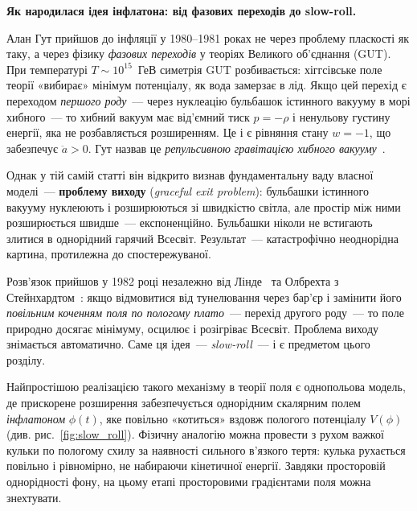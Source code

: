 \begin{keybox}
\textbf{Як народилася ідея інфлатона: від фазових переходів до slow-roll.}

Алан Гут прийшов до інфляції у 1980--1981 роках не через проблему
пласкості як таку, а через фізику \emph{фазових переходів} у теоріях
Великого об'єднання (GUT). При температурі $T \sim 10^{15}$~ГеВ
симетрія GUT розбивається: хіггсівське поле теорії «вибирає» мінімум
потенціалу, як вода замерзає в лід. Якщо цей перехід є переходом
\emph{першого роду}~--- через нуклеацію бульбашок істинного вакууму
в морі хибного~--- то хибний вакуум має від'ємний тиск $p = -\rho$
і ненульову густину енергії, яка не розбавляється розширенням.
Це і є рівняння стану $w = -1$, що забезпечує $\ddot{a} > 0$.
Гут назвав це \emph{репульсивною гравітацією хибного вакууму}~\cite{guth_1981}.

Однак у тій самій статті він відкрито визнав фундаментальну ваду
власної моделі~--- \textbf{проблему виходу} (\emph{graceful exit
problem}): бульбашки істинного вакууму нуклеюють і розширюються
зі швидкістю світла, але простір між ними розширюється швидше~---
експоненційно. Бульбашки ніколи не встигають злитися в однорідний
гарячий Всесвіт. Результат~--- катастрофічно неоднорідна картина,
протилежна до спостережуваної.

Розв'язок прийшов у 1982 році незалежно від Лінде~\cite{linde_1982}
та Олбрехта з Стейнхардтом~\cite{albrecht_1982}: якщо відмовитися
від тунелювання через бар'єр і замінити його \emph{повільним
коченням поля по пологому плато}~--- перехід другого роду~--- то
поле природно досягає мінімуму, осцилює і розігріває Всесвіт.
Проблема виходу знімається автоматично.
Саме ця ідея~--- \emph{slow-roll}~--- і є предметом цього розділу.
\end{keybox}

Найпростішою реалізацією такого механізму в теорії поля є однопольова
модель, де прискорене розширення забезпечується однорідним скалярним
полем \emph{інфлатоном} $\phi(t)$, яке повільно «котиться» вздовж
пологого потенціалу $V(\phi)$ (див. рис.~\ref{fig:slow_roll}). Фізичну аналогію можна провести з
рухом важкої кульки по пологому схилу за наявності сильного
в'язкого тертя: кулька рухається повільно і рівномірно, не
набираючи кінетичної енергії. Завдяки просторовій однорідності
фону, на цьому етапі просторовими градієнтами поля можна знехтувати.

